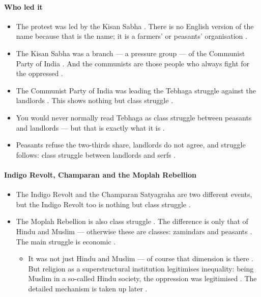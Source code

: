 \paragraph{Who led it}
\begin{itemize}
    \item The protest was led by the Kisan Sabha . There is no English version of the name because that is the name; it is a farmers' or peasants' organisation .
    \item The Kisan Sabha was a branch --- a pressure group --- of the Communist Party of India . And the communists are those people who always fight for the oppressed .
    \item The Communist Party of India was leading the Tebhaga struggle against the landlords . This shows nothing but class struggle .
\end{itemize}

\begin{CriticalPoint}
\begin{itemize}
    \item You would never normally read Tebhaga as class struggle between peasants and landlords --- but that is exactly what it is .
    \item Peasants refuse the two-thirds share, landlords do not agree, and struggle follows: class struggle between landlords and serfs .
\end{itemize}
\end{CriticalPoint}

\paragraph{Indigo Revolt, Champaran and the Moplah Rebellion}
\begin{itemize}
    \item The Indigo Revolt and the Champaran Satyagraha are two different events, but the Indigo Revolt too is nothing but class struggle .
    \item The Moplah Rebellion is also class struggle . The difference is only that of Hindu and Muslim --- otherwise these are classes: zamindars and peasants . The main struggle is economic .
    \begin{itemize}
        \item It was not just Hindu and Muslim --- of course that dimension is there . But religion as a superstructural institution legitimises inequality: being Muslim in a so-called Hindu society, the oppression was legitimised . The detailed mechanism is taken up later .
    \end{itemize}
\end{itemize}

